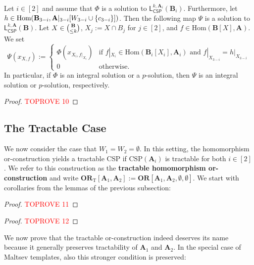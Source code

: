 \documentclass[a4paper,english, thm-restate]{lipics-v2021}
\newcommand{\defining}[1]{\textbf{#1}}
\DeclarePairedDelimiter\set{\lbrace}{\rbrace}
\newcommand{\StructA}{\mathbf{A}}
\newcommand{\StructB}{\mathbf{B}}
\newcommand{\CSP}[1]{\mathrm{CSP}(#1)}
\newcommand{\restrict}[2]{#1|_{#2}}
\newcommand{\Hom}[2]{\mathrm{Hom}(#1,#2)}
\newcommand{\leqs}{\mathsf{L}}
\newcommand{\cspiso}[3]{\leqs^{#1,#2}_{\mathsf{CSP}}(#3)}
\newcommand{\ORparam}[1]{\mathbf{OR}[#1]}
\newcommand{\ORT}[1]{\mathbf{OR}_\text{T}[#1]}
\begin{document}
	\begin{lemma}
		\label{lem:hom-or-solution}
		Let  $i \in [2]$ and assume that $\Phi$ is a solution to $\cspiso{k}{\StructA_i}{\StructB_i}$.
		Furthermore, let $h \in \Hom{\StructB_{3-i}}{\restrict{\StructA}{3-i}[W_{3-i}\cup\set{c_{3-i}}]}$.
		Then the following map $\Psi$ is a solution to $\cspiso{k}{\StructA}{\StructB}$.
		Let $X \in \tbinom{\StructB}{\leq k}$, $X_j := X \cap B_j$ for $j\in[2]$, and $f \in \Hom{\StructB[X]}{\StructA}$.
		We set
		\[
		\Psi(x_{X,f}) := \begin{cases}
			\Phi(x_{X_i, \restrict{f}{X_i}}) & \text{if }
			\restrict{f}{X_i} \in \Hom{\StructB_i[X_i]}{\StructA_i} \text { and } \restrict{f}{X_{3-i}} = \restrict{h}{X_{3-i}}\\
			0 & \text{otherwise.}
		\end{cases}
		\]
		In particular, if $\Phi$ is an integral solution or a $p$-solution,
		then $\Psi$ is an integral solution or $p$-solution, respectively.
	\end{lemma}
	\begin{proof}\textcolor{red}{TOPROVE 10}\end{proof}
	
	
	
	
	
	
	\subsection{The Tractable Case}
	\label{app:tractable-or}
	We now consider the case that $W_1=W_2=\emptyset$.
	In this setting, the homomorphism or-construction yields a tractable CSP
	if $\CSP{\StructA_i}$ is tractable for both $i\in[2]$.
	We refer to this construction as the \defining{tractable homomorphism or-construction} and write $\ORT{\StructA_1,\StructA_2} := \ORparam{\StructA_1,\StructA_2,\emptyset,\emptyset}$.
	We start with corollaries from the lemmas of the previous subsection:
	
	
	\homOrTractableKConsistency*
	\begin{proof}\textcolor{red}{TOPROVE 11}\end{proof}
	
	\homOrTractableSolution*
	\begin{proof}\textcolor{red}{TOPROVE 12}\end{proof}
	
	\noindent We now prove that the tractable or-construction indeed deserves its name because it generally preserves tractability of $\StructA_1$ and $\StructA_2$. In the special case of Maltsev templates, also this stronger condition is preserved: 
	
\end{document}
